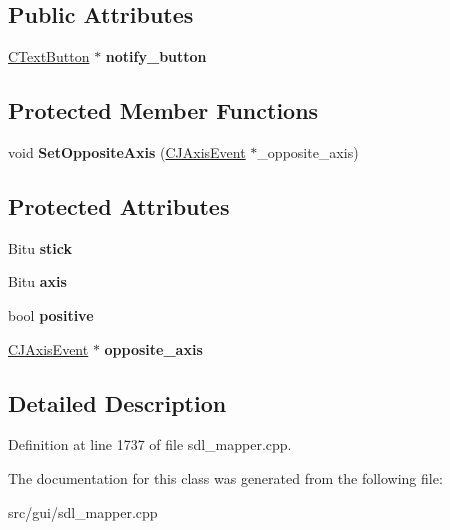 \subsection*{Public Attributes}
\begin{DoxyCompactItemize}
\item 
\hypertarget{classCJAxisEvent_a44cbf08bc0468daffe05f967810851f0}{\hyperlink{classCTextButton}{C\-Text\-Button} $\ast$ {\bfseries notify\-\_\-button}}\label{classCJAxisEvent_a44cbf08bc0468daffe05f967810851f0}

\end{DoxyCompactItemize}
\subsection*{Protected Member Functions}
\begin{DoxyCompactItemize}
\item 
\hypertarget{classCJAxisEvent_afdb866161b2dc0dd1d8a5331f9d39117}{void {\bfseries Set\-Opposite\-Axis} (\hyperlink{classCJAxisEvent}{C\-J\-Axis\-Event} $\ast$\-\_\-opposite\-\_\-axis)}\label{classCJAxisEvent_afdb866161b2dc0dd1d8a5331f9d39117}

\end{DoxyCompactItemize}
\subsection*{Protected Attributes}
\begin{DoxyCompactItemize}
\item 
\hypertarget{classCJAxisEvent_a4445db17f0538358d815ab53d449beba}{Bitu {\bfseries stick}}\label{classCJAxisEvent_a4445db17f0538358d815ab53d449beba}

\item 
\hypertarget{classCJAxisEvent_aef7080ddb8c0a07235865f4f8f33bf90}{Bitu {\bfseries axis}}\label{classCJAxisEvent_aef7080ddb8c0a07235865f4f8f33bf90}

\item 
\hypertarget{classCJAxisEvent_a90367a0731415ea7dd7b3d01fa153367}{bool {\bfseries positive}}\label{classCJAxisEvent_a90367a0731415ea7dd7b3d01fa153367}

\item 
\hypertarget{classCJAxisEvent_aef506ec736efabf7a118af104921a998}{\hyperlink{classCJAxisEvent}{C\-J\-Axis\-Event} $\ast$ {\bfseries opposite\-\_\-axis}}\label{classCJAxisEvent_aef506ec736efabf7a118af104921a998}

\end{DoxyCompactItemize}


\subsection{Detailed Description}


Definition at line 1737 of file sdl\-\_\-mapper.\-cpp.



The documentation for this class was generated from the following file\-:\begin{DoxyCompactItemize}
\item 
src/gui/sdl\-\_\-mapper.\-cpp\end{DoxyCompactItemize}
